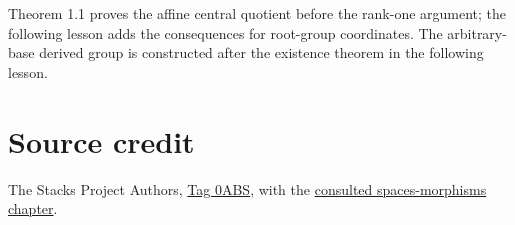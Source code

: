 \documentclass[11pt,a4paper,openany]{report}
\begin{document}
Theorem 1.1 proves the affine central quotient before the rank-one argument; the following lesson adds the consequences for root-group coordinates. The arbitrary-base derived group is constructed after the existence theorem in the following lesson.

\section{Source credit}\label{AG-RG-03-source-credit}

The Stacks Project Authors, \href{https://stacks.math.columbia.edu/tag/0ABS}{Tag 0ABS}, with the \href{https://github.com/KokunoYumeto/unofficial-stacks-project-ai-drafts/blob/565b10e987aba5969b21145a0833f42d69f96790/spaces-morphisms.tex}{consulted spaces-morphisms chapter}.
\end{document}
